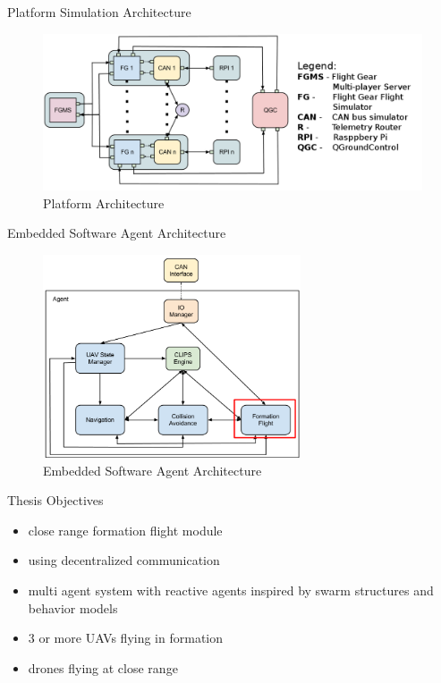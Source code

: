\documentclass{beamer}
\begin{document}
\begin{frame}{Platform Simulation Architecture}

\begin{center}
\begin{figure}[p]
\includegraphics[width=\textwidth]{img/platform-architecture.png}
\caption{Platform Architecture}
\end{figure}
\end{center}
\end{frame}

\begin{frame}{Embedded Software Agent Architecture}
\begin{center}
\begin{figure}[p]
\includegraphics[width=3in]{img/rpi-architecture.png}
\caption{Embedded Software Agent Architecture}
\end{figure}
\end{center}
\end{frame}

\begin{frame}{Thesis Objectives}
\begin{itemize}
\item close range formation flight module
\item using decentralized communication
\item multi agent system with reactive agents inspired by swarm structures and behavior models
\item 3 or more UAVs flying in formation
\item drones flying at close range
\end{itemize}
\end{frame}
\end{document}
